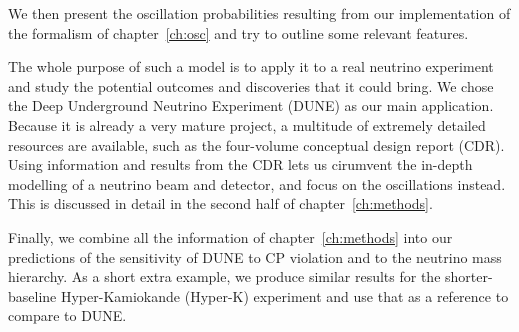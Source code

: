 We then present the oscillation probabilities resulting from our
implementation of the formalism of chapter~\ref{ch:osc} and try to outline some
relevant features. 

The whole purpose of such a model is to apply it to a real neutrino experiment
and study the potential outcomes and discoveries that it could bring.
We chose the Deep Underground Neutrino Experiment (DUNE) as our main
application. Because it is already a very mature project, a multitude of
extremely detailed resources are available, such as the four-volume conceptual
design report\cite{cdr-all} (CDR). Using information and results from the CDR
lets us cirumvent the in-depth modelling of a neutrino beam and detector, and
focus on the oscillations instead. This is discussed in detail in the second
half of chapter~\ref{ch:methods}.

Finally, we combine all the information of chapter~\ref{ch:methods} into our
predictions of the sensitivity of DUNE to CP violation and to the neutrino mass
hierarchy.
As a short extra example, we produce similar results for the shorter-baseline
Hyper-Kamiokande (Hyper-K) experiment and use that as a reference to
compare to DUNE.


